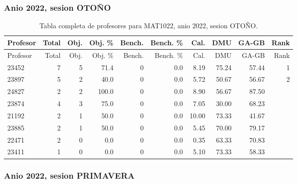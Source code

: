 \subsubsection{Anio 2022, sesion OTOÑO}

\begingroup
\scriptsize
\setlength{\tabcolsep}{3pt}
\begin{longtable}{lrrrrrrrrr}
\caption{Tabla completa de profesores para MAT1022, anio 2022, sesion OTOÑO.}\label{tab:prof-period-mat1022-2022-oto-o-especializado}\\
\toprule
Profesor & Total & Obj. & Obj. \% & Bench. & Bench. \% & Cal. & DMU & GA-GB & Rank \\
\midrule
\endfirsthead
\toprule
Profesor & Total & Obj. & Obj. \% & Bench. & Bench. \% & Cal. & DMU & GA-GB & Rank \\
\midrule
\endhead
23452 & 7 & 5 & 71.4 & 0 & 0.0 & 8.19 & 75.24 & 57.44 & 1 \\
23897 & 5 & 2 & 40.0 & 0 & 0.0 & 5.72 & 50.67 & 56.67 & 2 \\
24827 & 2 & 2 & 100.0 & 0 & 0.0 & 8.90 & 56.67 & 87.50 &  \\
23874 & 4 & 3 & 75.0 & 0 & 0.0 & 7.05 & 30.00 & 68.23 &  \\
21192 & 2 & 1 & 50.0 & 0 & 0.0 & 10.00 & 73.33 & 41.67 &  \\
23885 & 2 & 1 & 50.0 & 0 & 0.0 & 5.45 & 70.00 & 79.17 &  \\
22471 & 2 & 0 & 0.0 & 0 & 0.0 & 0.35 & 63.33 & 70.83 &  \\
23411 & 1 & 0 & 0.0 & 0 & 0.0 & 5.10 & 73.33 & 58.33 &  \\
\bottomrule
\end{longtable}
\endgroup

\subsubsection{Anio 2022, sesion PRIMAVERA}

